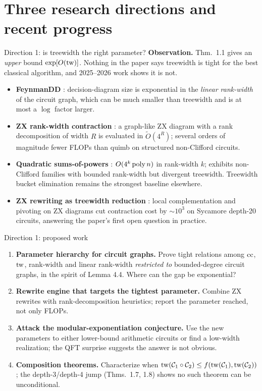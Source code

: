 \section{Three research directions and recent progress}

\begin{frame}{Direction 1: is treewidth the right parameter?}
    \textbf{Observation.} Thm.~1.1 gives an \emph{upper} bound $\exp[O(\operatorname{tw})]$. Nothing in the paper says treewidth is tight for the best classical algorithm, and 2025--2026 work shows it is not.
    \begin{itemize}
        \item \textbf{FeynmanDD} \parencite{feynmandd2025}: decision-diagram size is exponential in the \emph{linear rank-width} of the circuit graph, which can be much smaller than treewidth and is at most a $\log$ factor larger.
        \item \textbf{ZX rank-width contraction} \parencite{zxrankwidth2026}: a graph-like ZX diagram with a rank decomposition of width $R$ is evaluated in $\tilde O(4^R)$; several orders of magnitude fewer FLOPs than quimb on structured non-Clifford circuits.
        \item \textbf{Quadratic sums-of-powers} \parencite{sumsofpowers2026}: $O(4^k\operatorname{poly} n)$ in rank-width $k$; exhibits non-Clifford families with bounded rank-width but divergent treewidth. Treewidth bucket elimination remains the strongest baseline elsewhere.
        \item \textbf{ZX rewriting as treewidth reduction} \parencite{zxspeedup2023}: local complementation and pivoting on ZX diagrams cut contraction cost by $\sim10^3$ on Sycamore depth-20 circuits, answering the paper's first open question in practice.
    \end{itemize}
\end{frame}

\begin{frame}{Direction 1: proposed work}
    \begin{enumerate}
        \item \textbf{Parameter hierarchy for circuit graphs.} Prove tight relations among $\operatorname{cc}$, $\operatorname{tw}$, rank-width and linear rank-width \emph{restricted to} bounded-degree circuit graphs, in the spirit of Lemma 4.4. Where can the gap be exponential?
        \item \textbf{Rewrite engine that targets the tightest parameter.} Combine ZX rewrites with rank-decomposition heuristics; report the parameter reached, not only FLOPs.
        \item \textbf{Attack the modular-exponentiation conjecture.} Use the new parameters to either lower-bound arithmetic circuits or find a low-width realization; the QFT surprise suggests the answer is not obvious.
        \item \textbf{Composition theorems.} Characterize when $\operatorname{tw}(\mathcal{C}_1\circ\mathcal{C}_2)\le f(\operatorname{tw}(\mathcal{C}_1),\operatorname{tw}(\mathcal{C}_2))$; the depth-3/depth-4 jump (Thms.~1.7, 1.8) shows no such theorem can be unconditional.
    \end{enumerate}
\end{frame}


